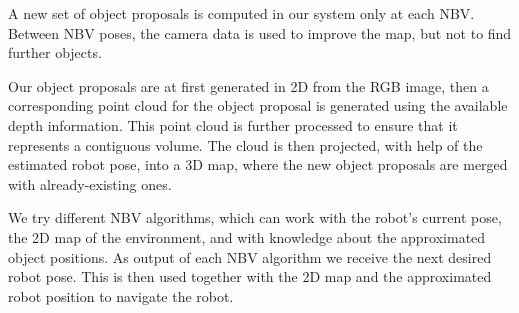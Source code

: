 A new set of object proposals is computed in our system only at each NBV.
Between NBV poses, the camera data is used to improve the map, but not to find further objects.

Our object proposals are at first generated in 2D from the RGB image, then a corresponding point cloud for the object proposal is generated using the available depth information.
This point cloud is further processed to ensure that it represents a contiguous volume.
The cloud is then projected, with help of the estimated robot pose, into a 3D map, where the new object proposals are merged with already-existing ones.

We try different NBV algorithms, which can work with the robot's current pose, the 2D map of the environment, and with knowledge about the approximated object positions.
As output of each NBV algorithm we receive the next desired robot pose.
This is then used together with the 2D map and the approximated robot position to navigate the robot.


